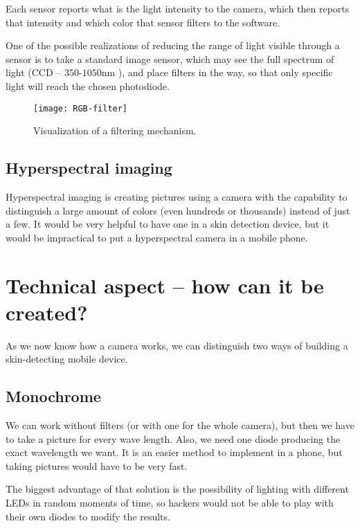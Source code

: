             Each sensor reports what is the light intensity to the camera, which then
            reports that intensity and which color that sensor filters to the software.

            One of the possible realizations of reducing the range
            of light visible through a sensor is to take a standard image sensor, which
            may see the full spectrum of light (CCD -- $350$-$1050$nm
            \cite{imagesensorsmax}), and place filters
            in the way, so that only specific light will reach the chosen photodiode.

            \begin{figure}[H]
                \caption{Visualization of a filtering mechanism.}
                \centering
                \texttt{[image: RGB-filter]}
                \label{fig:RGB-filter}
            \end{figure}

        \subsection*{Hyperspectral imaging}
            Hyperspectral imaging is creating pictures using a camera with the
            capability to distinguish a large amount of colors
            (even hundreds or thousands) instead of just a few.
            It would be very helpful to have one in a skin detection device,
            but it would be impractical to put a hyperspectral camera in a mobile phone.

    \section{Technical aspect -- how can it be created?}
        As we now know how a camera works, we can distinguish two ways of
        building a skin-detecting mobile device.
        \subsection*{Monochrome}
            We can work without filters (or with one for the whole camera),
            but then we have to take a picture for every wave length.
            Also, we need one diode producing the exact wavelength we want.
            It is an easier method to implement in a phone, but taking pictures
            would have to be very fast.

            The biggest advantage of that solution is the possibility of lighting
            with different LEDs in random moments of time, so hackers
            would not be able to play with their own diodes to modify the results.

